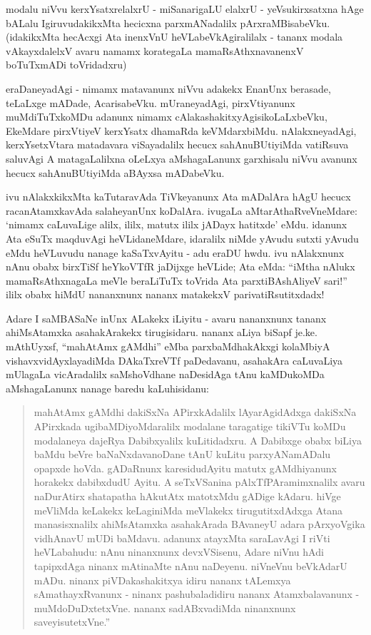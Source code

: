 modalu niVvu kerxYsatxrelalxrU - miSanarigaLU elalxrU - yeVsukirxsatxna hAge bALalu IgiruvudakikxMta hecicxna parxmANadalilx pArxraMBisabeVku. (idakikxMta hecAcxgi Ata inenxVnU heVLabeVkAgiralilalx - tananx modala vAkayxdalelxV avaru namamx korategaLa mamaRsAthxnavanenxV boTuTxmADi toVridadxru)

eraDaneyadAgi - nimamx matavanunx niVvu adakekx EnanUnx berasade, teLaLxge mADade, AcarisabeVku. mUraneyadAgi, pirxVtiyanunx muMdiTuTxkoMDu adanunx nimamx cAlakashakitxyAgisikoLaLxbeVku, EkeMdare pirxVtiyeV kerxYsatx dhamaRda keVMdarxbiMdu. nAlakxneyadAgi, kerxYsetxVtara matadavara viSayadalilx hecucx sahAnuBUtiyiMda vatiRsuva saluvAgi A matagaLalilxna oLeLxya aMshagaLanunx garxhisalu niVvu avanunx hecucx sahAnuBUtiyiMda aBAyxsa mADabeVku.

ivu nAlakxkikxMta kaTutaravAda TiVkeyanunx Ata mADalAra hAgU hecucx racanAtamxkavAda salaheyanUnx koDalAra. ivugaLa aMtarAthaRveVneMdare: `nimamx caLuvaLige alilx, ililx, matutx ililx jADayx hatitxde' eMdu. idanunx Ata eSuTx maqduvAgi heVLidaneMdare, idaralilx niMde yAvudu sutxti yAvudu eMdu heVLuvudu nanage kaSaTxvAyitu - adu eraDU hwdu. ivu nAlakxnunx nAnu obabx birxTiSf heYkoVTfR jaDijxge heVLide; Ata eMda: ``iMtha nAlukx mamaRsAthxnagaLa meVle beraLiTuTx toVrida Ata parxtiBAshAliyeV sari!'' ililx obabx hiMdU nananxnunx nananx matakekxV parivatiRsutitxdadx!

Adare I saMBASaNe inUnx ALakekx iLiyitu - avaru nananxnunx tananx ahiMsAtamxka asahakArakekx tirugisidaru. nananx aLiya biSapf je.ke. mAthUyxsf, ``mahAtAmx gAMdhi'' eMba parxbaMdhakAkxgi kolaMbiyA vishavxvidAyxlayadiMda DAkaTxreVTf paDedavanu, asahakAra caLuvaLiya mUlagaLa vicAradalilx saMshoVdhane naDesidAga tAnu kaMDukoMDa aMshagaLanunx nanage baredu kaLuhisidanu: 

\begin{quote}
mahAtAmx gAMdhi dakiSxNa APirxkAdalilx lAyarAgidAdxga dakiSxNa APirxkada ugibaMDiyoMdaralilx modalane taragatige tikiVTu koMDu modalaneya dajeRya Dabibxyalilx kuLitidadxru. A Dabibxge obabx biLiya baMdu beVre baNaNxdavanoDane tAnU kuLitu parxyANamADalu opapxde hoVda. gADaRnunx karesidudAyitu matutx gAMdhiyanunx horakekx dabibxdudU Ayitu. A seTxVSanina pAlxTfPAramimxnalilx avaru naDurAtirx shatapatha hAkutAtx matotxMdu gADige kAdaru. hiVge meVliMda keLakekx keLaginiMda meVlakekx tirugutitxdAdxga Atana manasisxnalilx ahiMsAtamxka asahakArada BAvaneyU adara pArxyoVgika vidhAnavU mUDi baMdavu. adanunx atayxMta saraLavAgi I riVti heVLabahudu: nAnu ninanxnunx devxVSisenu, Adare niVnu hAdi tapipxdAga ninanx mAtinaMte nAnu naDeyenu. niVneVnu beVkAdarU mADu. ninanx piVDakashakitxya idiru nananx tALemxya sAmathayxRvanunx - ninanx pashubaladidiru nananx Atamxbalavanunx - muMdoDuDx\-tetxVne. nananx sadABxvadiMda ninanxnunx saveyisutetxVne.''
\end{quote}

